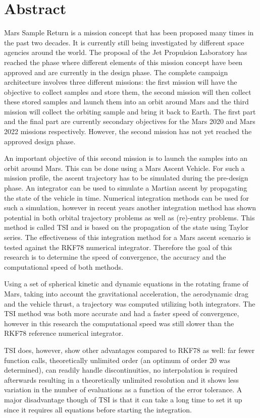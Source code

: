 \chapter*{Abstract}
\label{ch:Abstract}
Mars Sample Return is a mission concept that has been proposed many times in the past two decades. It is currently still being investigated by different space agencies around the world. The proposal of the Jet Propulsion Laboratory has reached the phase where different elements of this mission concept have been approved and are currently in the design phase. The complete campaign architecture involves three different missions: the first mission will have the objective to collect samples and store them, the second mission will then collect these stored samples and launch them into an orbit around Mars and the third mission will collect the orbiting sample and bring it back to Earth. The first part and the final part are currently secondary objectives for the Mars 2020 and Mars 2022 missions respectively. However, the second mission has not yet reached the approved design phase. 

An important objective of this second mission is to launch the samples into an orbit around Mars. This can be done using a Mars Ascent Vehicle. For such a mission profile, the ascent trajectory has to be simulated during the pre-design phase. An integrator can be used to simulate a Martian ascent by propagating the state of the vehicle in time. Numerical integration methods can be used for such a simulation, however in recent years another integration method has shown potential in both orbital trajectory problems as well as (re)-entry problems. This method is called \acf{TSI} and is based on the propagation of the state using Taylor series. The effectiveness of this integration method for a Mars ascent scenario is tested against the \acf{RKF78} numerical integrator. Therefore the goal of this research is to determine the speed of convergence, the accuracy and the computational speed of both methods. 

Using a set of spherical kinetic and dynamic equations in the rotating frame of Mars, taking into account the gravitational acceleration, the aerodynamic drag and the vehicle thrust, a trajectory was computed utilizing both integrators. The \ac{TSI} method was both more accurate and had a faster speed of convergence, however in this research the computational speed was still slower than the \ac{RKF78} reference numerical integrator. 

\ac{TSI} does, however, show other advantages compared to \ac{RKF78} as well: far fewer function calls, theoretically unlimited order (an optimum of order 20 was determined), can readily handle discontinuities, no interpolation is required afterwards resulting in a theoretically unlimited resolution and it shows less variation in the number of evaluations as a function of the error tolerance. A major disadvantage though of \ac{TSI} is that it can take a long time to set it up since it requires all equations before starting the integration.

